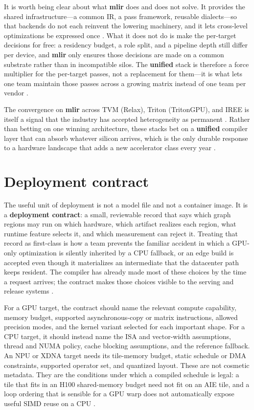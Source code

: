 It is worth being clear about what \textbf{mlir} does and does not solve. It provides the shared infrastructure---a common IR, a pass framework, reusable dialects---so that backends do not each reinvent the lowering machinery, and it lets cross-level optimizations be expressed once \citep{lai2023relax,iree2024}. What it does not do is make the per-target decisions for free: a residency budget, a role split, and a pipeline depth still differ per device, and \textbf{mlir} only ensures those decisions are made on a common substrate rather than in incompatible silos. The \textbf{unified} stack is therefore a force multiplier for the per-target passes, not a replacement for them---it is what lets one team maintain those passes across a growing matrix instead of one team per vendor \citep{yirage2026,wu2024mirage}.

The convergence on \textbf{mlir} across TVM (Relax), Triton (TritonGPU), and IREE is itself a signal that the industry has accepted heterogeneity as permanent \citep{lai2023relax,tillet2019triton,iree2024}. Rather than betting on one winning architecture, these stacks bet on a \textbf{unified} compiler layer that can absorb whatever silicon arrives, which is the only durable response to a hardware landscape that adds a new accelerator class every year \citep{amd2024aie,chen2018tvm}.

\section{Deployment contract}
\label{sec:ch24_deployment_contract}

The useful unit of deployment is not a model file and not a container image. It is a \textbf{deployment contract}: a small, reviewable record that says which graph regions may run on which hardware, which artifact realizes each region, what runtime feature selects it, and which measurement can reject it. Treating that record as first-class is how a team prevents the familiar accident in which a GPU-only optimization is silently inherited by a CPU fallback, or an edge build is accepted even though it materializes an intermediate that the datacenter path keeps resident. The compiler has already made most of these choices by the time a request arrives; the contract makes those choices visible to the serving and release systems \citep{iree2024,yirage2026,rotem2018glow}.

For a GPU target, the contract should name the relevant compute capability, memory budget, supported asynchronous-copy or matrix instructions, allowed precision modes, and the kernel variant selected for each important shape. For a CPU target, it should instead name the ISA and vector-width assumptions, thread and NUMA policy, cache blocking assumptions, and the reference fallback. An NPU or XDNA target needs its tile-memory budget, static schedule or DMA constraints, supported operator set, and quantized layout. These are not cosmetic metadata. They are the conditions under which a compiled schedule is legal: a tile that fits in an H100 shared-memory budget need not fit on an AIE tile, and a loop ordering that is sensible for a GPU warp does not automatically expose useful SIMD reuse on a CPU \citep{nvidia2022hopper,amd2024aie,amd2024xdna}.

